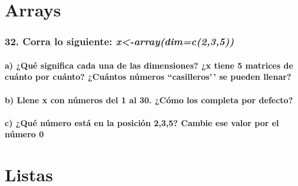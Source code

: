\documentclass[
]{article}
\begin{document}
\hypertarget{arrays}{%
\section{\texorpdfstring{\textbf{Arrays}}{Arrays}}\label{arrays}}

\hypertarget{corra-lo-siguiente-x-arraydimc235}{%
\subsubsection{\texorpdfstring{32. Corra lo siguiente:
\emph{x\textless-array(dim=c(2,3,5))}}{32. Corra lo siguiente: x\textless-array(dim=c(2,3,5))}}\label{corra-lo-siguiente-x-arraydimc235}}

\hypertarget{a-quuxe9-significa-cada-una-de-las-dimensiones-x-tiene-5-matrices-de-cuuxe1nto-por-cuuxe1nto-cuuxe1ntos-nuxfameros-casilleros-se-pueden-llenar}{%
\paragraph{a) ¿Qué significa cada una de las dimensiones? ¿x tiene 5
matrices de cuánto por cuánto? ¿Cuántos números ``casilleros'\,' se
pueden
llenar?}\label{a-quuxe9-significa-cada-una-de-las-dimensiones-x-tiene-5-matrices-de-cuuxe1nto-por-cuuxe1nto-cuuxe1ntos-nuxfameros-casilleros-se-pueden-llenar}}

\hypertarget{b-llene-x-con-nuxfameros-del-1-al-30.-cuxf3mo-los-completa-por-defecto}{%
\paragraph{b) Llene x con números del 1 al 30. ¿Cómo los completa por
defecto?}\label{b-llene-x-con-nuxfameros-del-1-al-30.-cuxf3mo-los-completa-por-defecto}}

\hypertarget{c-quuxe9-nuxfamero-estuxe1-en-la-posiciuxf3n-235-cambie-ese-valor-por-el-nuxfamero-0}{%
\paragraph{c) ¿Qué número está en la posición 2,3,5? Cambie ese valor
por el número
0}\label{c-quuxe9-nuxfamero-estuxe1-en-la-posiciuxf3n-235-cambie-ese-valor-por-el-nuxfamero-0}}

\hypertarget{listas}{%
\section{\texorpdfstring{\textbf{Listas}}{Listas}}\label{listas}}
\end{document}
